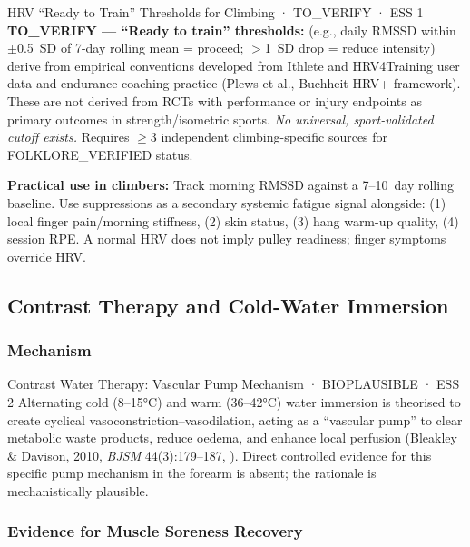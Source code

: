 \begin{toverifybox}{HRV ``Ready to Train'' Thresholds for Climbing · TO\_VERIFY · ESS 1}
\textbf{TO\_VERIFY --- ``Ready to train'' thresholds:} (e.g., daily RMSSD within $\pm$0.5~SD of 7-day rolling mean = proceed; $>$1~SD drop = reduce intensity) derive from empirical conventions developed from Ithlete and HRV4Training user data and endurance coaching practice (Plews et al., Buchheit HRV+ framework). These are not derived from RCTs with performance or injury endpoints as primary outcomes in strength/isometric sports. \emph{No universal, sport-validated cutoff exists.} Requires $\geq$3 independent climbing-specific sources for FOLKLORE\_VERIFIED status.
\end{toverifybox}

\textbf{Practical use in climbers:} Track morning RMSSD against a 7--10~day rolling baseline. Use suppressions as a secondary systemic fatigue signal alongside: (1) local finger pain/morning stiffness, (2) skin status, (3) hang warm-up quality, (4) session RPE. A normal HRV does not imply pulley readiness; finger symptoms override HRV.

\subsection{Contrast Therapy and Cold-Water Immersion}

\subsubsection*{Mechanism}

\begin{bioplausbox}{Contrast Water Therapy: Vascular Pump Mechanism · BIOPLAUSIBLE · ESS 2}
Alternating cold (8--15°C) and warm (36--42°C) water immersion is theorised to create cyclical vasoconstriction--vasodilation, acting as a ``vascular pump'' to clear metabolic waste products, reduce oedema, and enhance local perfusion (Bleakley \& Davison, 2010, \emph{BJSM} 44(3):179--187, \cite{BD09}). Direct controlled evidence for this specific pump mechanism in the forearm is absent; the rationale is mechanistically plausible.
\end{bioplausbox}

\subsubsection*{Evidence for Muscle Soreness Recovery}

